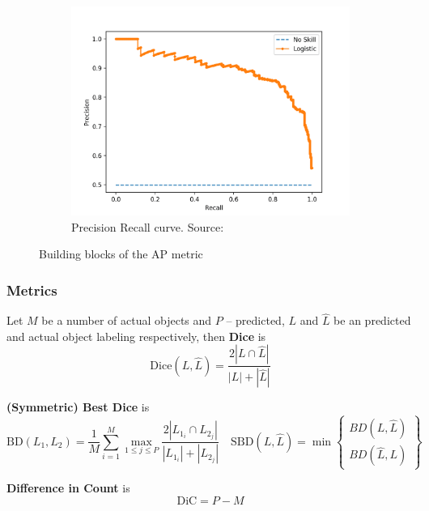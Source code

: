 \documentclass{beamer}
\begin{document}
\begin{frame}
\begin{figure}[h]
\begin{subfigure}{0.3\textwidth}
        \end{subfigure}
        \begin{subfigure}{0.3\textwidth}
            \includegraphics[height=0.25\textheight, trim={2cm 0.5cm 4.5cm 4cm},clip]{pr_curve.png}
            \caption{Precision Recall curve. Source: \cite{pr_auc}}
        \end{subfigure}
        \caption{Building blocks of the AP metric}
    \end{figure}

\end{frame}

\begin{frame}
    \frametitle{Metrics}

    Let $M$ be a number of actual objects and $P$ -- predicted,
    $L$ and $\hat{L}$ be an
    predicted and actual object labeling respectively, then
    \textbf{Dice} is
    \[
        \text{Dice}(L, \hat{L}) = \frac{2|L \cap \hat{L}|}{|L| + |\hat{L}|}
    \]

    \textbf{(Symmetric) Best Dice} is
    \[
        \text{BD}(L_1, L_2) =
        \frac{1}{M} \sum\limits_{i=1}^{M} \max\limits_{1 \leq j \leq P}
        \frac{2|L_{1_i} \cap L_{2_j}|}{|L_{1_i}| + |L_{2_j}|}
        \quad
        \text{SBD}(L, \hat{L}) =
        \min \left\{ \substack{BD(L, \hat{L}) \\ BD(\hat{L}, L)} \right\}
    \]

    \textbf{Difference in Count} is
    \[
        \text{DiC} = P - M
    \]

\end{frame}
\end{document}
